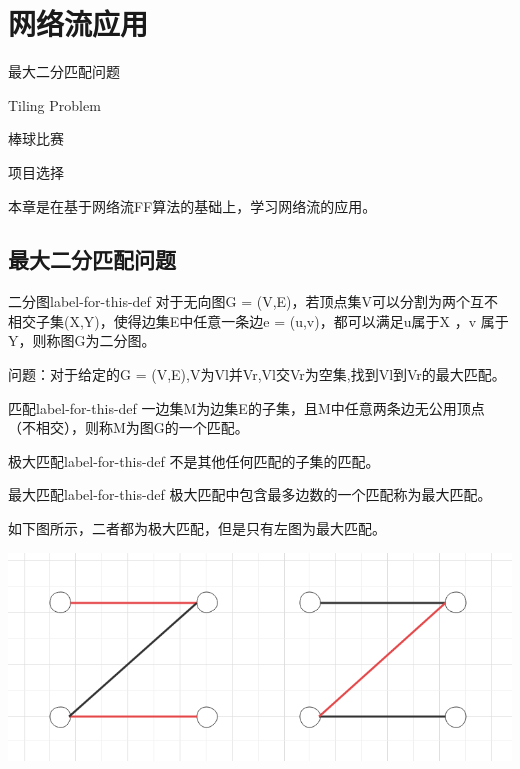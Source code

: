 \chapter{网络流应用}

\begin{introduction}
\item 最大二分匹配问题
\item Tiling Problem
\item 棒球比赛
\item 项目选择
\end{introduction}

本章是在基于网络流FF算法的基础上，学习网络流的应用。

\section{最大二分匹配问题}

\begin{definition}{二分图}{label-for-this-def}
    对于无向图G = (V,E)，若顶点集V可以分割为两个互不相交子集(X,Y)，使得边集E中任意一条边e = (u,v)，都可以满足u属于X ，v 属于Y，则称图G为二分图。
\end{definition}

问题：对于给定的G = (V,E),V为Vl并Vr,Vl交Vr为空集,找到Vl到Vr的最大匹配。

\begin{definition}{匹配}{label-for-this-def}
    一边集M为边集E的子集，且M中任意两条边无公用顶点（不相交），则称M为图G的一个匹配。
\end{definition}

\begin{definition}{极大匹配}{label-for-this-def}
    不是其他任何匹配的子集的匹配。
\end{definition}

\begin{definition}{最大匹配}{label-for-this-def}
    极大匹配中包含最多边数的一个匹配称为最大匹配。
\end{definition}

如下图所示，二者都为极大匹配，但是只有左图为最大匹配。

\centerline{\includegraphics[scale=0.4]{Ln11.image/networkflow1.png}}



